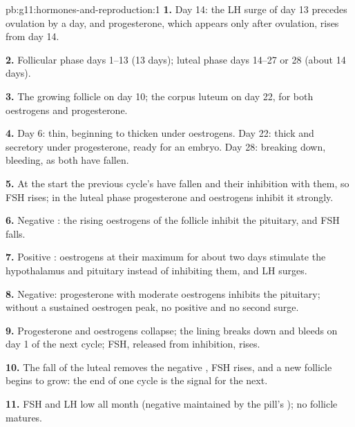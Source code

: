 \begin{solution}{pb:g11:hormones-and-reproduction:1}
\textbf{1.} Day 14: the LH surge of day 13 precedes ovulation by a
day, and progesterone, which appears only after ovulation, rises from
day 14.

\textbf{2.} Follicular phase days 1--13 (13 days); luteal phase days
14--27 or 28 (about 14 days).

\textbf{3.} The growing follicle on day 10; the corpus luteum on day
22, for both oestrogens and progesterone.

\textbf{4.} Day 6: thin, beginning to thicken under oestrogens. Day
22: thick and secretory under progesterone, ready for an embryo. Day
28: breaking down, bleeding, as both  have fallen.

\textbf{5.} At the start the previous cycle's  have fallen and
their inhibition with them, so FSH rises; in the luteal phase
progesterone and oestrogens inhibit it strongly.

\textbf{6.} Negative : the rising oestrogens of the follicle
inhibit the pituitary, and FSH falls.

\textbf{7.} Positive : oestrogens at their maximum for about
two days stimulate the hypothalamus and pituitary instead of
inhibiting them, and LH surges.

\textbf{8.} Negative: progesterone with moderate oestrogens inhibits
the pituitary; without a sustained oestrogen peak, no positive
 and no second surge.

\textbf{9.} Progesterone and oestrogens collapse; the lining breaks
down and bleeds on day 1 of the next cycle; FSH, released from
inhibition, rises.

\textbf{10.} The fall of the luteal  removes the negative
, FSH rises, and a new follicle begins to grow: the end of
one cycle is the signal for the next.

\textbf{11.} FSH and LH low all month (negative  maintained
by the pill's ); no follicle matures.


\end{solution}
